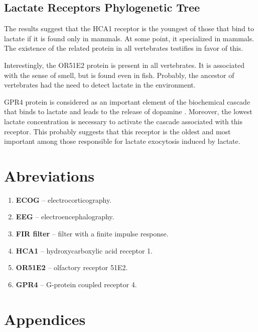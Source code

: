 \documentclass[14pt,a4paper]{scrartcl}
\begin{document}
\subsection{Lactate Receptors Phylogenetic Tree}
\label{sec:Conclusions:Naked Mole-rats Experiment}

The results suggest that the HCA1 receptor is the youngest of those that bind to lactate if it is found only in mammals. At some point, it specialized in mammals. The existence of the related protein in all vertebrates testifies in favor of this.

Interestingly, the OR51E2 protein is present in all vertebrates. It is associated with the sense of smell, but is found even in fish. Probably, the ancestor of vertebrates had the need to detect lactate in the environment. 

GPR4 protein is considered as an important element of the biochemical cascade that binds to lactate and leads to the release of dopamine \citep{Mosienko2018}. Moreover, the lowest lactate concentration is necessary to activate the cascade associated with this receptor. This probably suggests that this receptor is the oldest and most important among those responsible for lactate exocytosis induced by lactate.

\newpage
\section*{Abreviations}
\label{sec:Abreviations}

\begin{enumerate}
  \item \textbf{ECOG} – electrocorticography.
  \item \textbf{EEG} – electroencephalography.
  \item \textbf{FIR filter} – filter with a finite impulse response.
  \item \textbf{HCA1} – hydroxycarboxylic acid receptor 1.
  \item \textbf{OR51E2} – olfactory receptor 51E2.
  \item \textbf{GPR4} – G-protein coupled receptor 4. 
\end{enumerate}

\newpage
\section*{Appendices}
\label{sec:Appendices}
\end{document}

